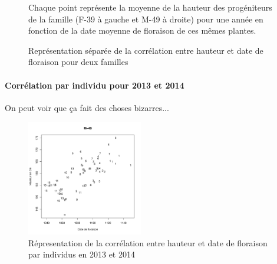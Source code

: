 \documentclass[12pt,a4paper]{article}
\begin{document}
				\begin{figure}[!h]
					\caption{Représentation séparée de la corrélation entre hauteur et date de floraison pour deux familles \label{correl.fam}}
					Chaque point représente la moyenne de la hauteur des progéniteurs de la famille (F-39 à gauche et M-49 à droite) pour une année en fonction de la date moyenne de floraison de ces mêmes plantes.
				\end{figure}
				
			\paragraph{Corrélation par individu pour 2013 et 2014}
				
				On peut voir que ça fait des choses bizarres...
				
				\begin{figure}[h]
					\centering
					\includegraphics[width=0.45\textwidth]{plot_haut-flo_m49.pdf}
					\caption{Répresentation de la corrélation entre hauteur et date de floraison par individus en 2013 et 2014 \label{correl.ind}}
				\end{figure}
			
\end{document}
